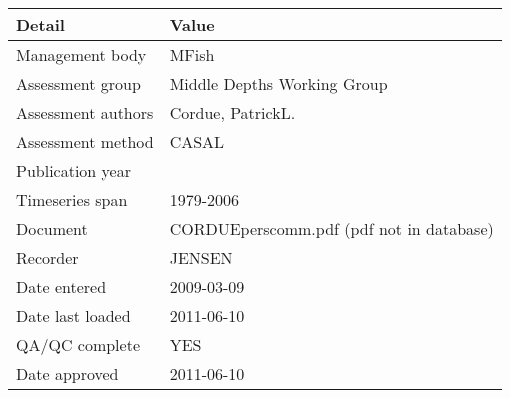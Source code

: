 \begin{table}[htb]
\centering
\begin{tabular}{ll}
\toprule
Detail & Value \\
\midrule
Management body    & MFish                                    \\
Assessment group   & Middle Depths Working Group              \\
Assessment authors & Cordue, PatrickL.                        \\
Assessment method  & CASAL                                    \\
Publication year   &                                          \\
Timeseries span    & 1979-2006                                \\
Document           & CORDUEperscomm.pdf (pdf not in database) \\
Recorder           & JENSEN                                   \\
Date entered       & 2009-03-09                               \\
Date last loaded   & 2011-06-10                               \\
QA/QC complete     & YES                                      \\
Date approved      & 2011-06-10                               \\
\bottomrule
\end{tabular}
\label{tab:assessdet}
\end{table}
